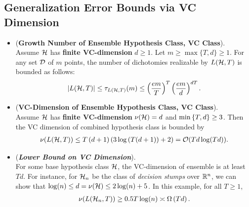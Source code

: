 \documentclass[11pt]{article}
\begin{document}
\subsection{Generalization Error Bounds via VC Dimension}
\begin{itemize}
\item \begin{lemma} (\textbf{Growth Number of Ensemble Hypothesis Class, VC Class}). \citep{schapire2012boosting}\\
Assume ${\mathcal H}$ has \textbf{finite VC-dimension} $d \ge 1$. Let $m \ge \max\{T, d\} \ge 1$. For any set ${\mathcal D}$ of $m$ points, the number of dichotomies realizable by $L({\mathcal H}, T)$ is bounded as follows:
\begin{align}
\left\lvert L({\mathcal H}, T) \right\rvert \le \tau_{L({\mathcal H}, T)}(m) \le \left(\frac{em}{T}\right)^T \left(\frac{em}{d}\right)^{dT}.  \label{ineqn: growth_fun_ensemble_infinite}
\end{align}
\end{lemma}

\item \begin{lemma} (\textbf{VC-Dimension of Ensemble Hypothesis Class, VC Class}). \citep{schapire2012boosting, shalev2014understanding}\\
Assume ${\mathcal H}$ has \textbf{finite VC-dimension} $\nu({\mathcal H}) = d$ and $\min\left\{T, d\right\} \ge 3$. Then the VC dimension of combined hypothesis class is bounded by
\begin{align}
\nu(L({\mathcal H}, T)) \le T\left(d + 1\right)\left(3\log\left(T(d+1)\right) + 2\right) = {\mathcal O}(Td \log(Td)).  \label{ineqn: vc_dim_ensemble_infinite}
\end{align}
\end{lemma}

\item \begin{remark}(\textbf{\emph{Lower Bound on VC Dimension}}). \citep{shalev2014understanding}\\
For some base hypothesis class ${\mathcal H}$, the VC-dimension of ensemble is at least $Td$. For instance, for ${\mathcal H}_n$  be the class of \emph{decision stumps} over ${\mathbb R}^n$,  we can show that $\log(n) \le d = \nu({\mathcal H}) \le 2\log(n) + 5$.  In this example, for all $T \ge 1$, 
\begin{align*}
\nu(L({\mathcal H}_n, T)) \ge 0.5T\log(n) \asymp \Omega\left(Td\right).
\end{align*} 
\end{remark}


\end{itemize}
\end{document}
